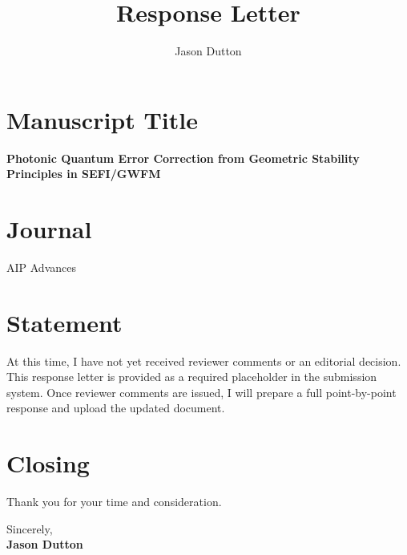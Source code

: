 \documentclass[12pt]{article}
\begin{document}
\title{Response Letter}
\author{Jason Dutton}
\date{}
\maketitle

\section*{Manuscript Title}
\textbf{Photonic Quantum Error Correction from Geometric Stability Principles in SEFI/GWFM}

\section*{Journal}
AIP Advances

\section*{Statement}
At this time, I have not yet received reviewer comments or an editorial decision. 
This response letter is provided as a required placeholder in the submission system. 
Once reviewer comments are issued, I will prepare a full point-by-point response and upload the updated document.

\section*{Closing}
Thank you for your time and consideration.

\vspace{0.5cm}

Sincerely,\\[0.2cm]
\textbf{Jason Dutton}
\end{document}
